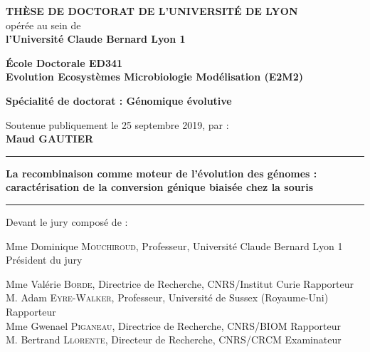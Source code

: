 \begin{center}
\fontsize{14pt}{16pt}\selectfont
\textbf{\uppercase{Thèse de doctorat de l'université de Lyon}}\\
\fontsize{12pt}{14pt}\selectfont
opérée au sein de\\
\textbf{l'Université Claude Bernard Lyon 1}

\vspace{0.5cm}

\textbf{École Doctorale ED341\\%
Evolution Ecosyst\`emes Microbiologie Modélisation (E2M2)}%

\vspace{0.5cm}

\textbf{Spécialité de doctorat : Génomique évolutive}\\


\vspace{1.5cm}

Soutenue publiquement le 25 septembre 2019, par :\\
\vspace{0.1cm}
\fontsize{14pt}{16pt}\selectfont
\textbf{Maud GAUTIER}

\vspace{1.5cm} %

\rule[20pt]{\textwidth}{0.5pt}

\fontsize{25pt}{28pt}\selectfont
\textbf{La recombinaison comme moteur de l'\'evolution des g\'enomes : caract\'erisation de la conversion g\'enique biais\'ee chez la souris}

\rule{\textwidth}{0.5pt}

\vspace{2cm} %
\end{center}

\fontsize{12pt}{14pt}\selectfont
Devant le jury composé de :
\bigskip\bigskip

\fontsize{11pt}{13pt}\selectfont
%
Mme Dominique \textsc{Mouchiroud}, Professeur, Universit\'e Claude Bernard Lyon 1 \hfill Pr\'esident du jury\bigskip %
%

Mme Val\'erie \textsc{Borde}, Directrice de Recherche, CNRS/Institut Curie \hfill  Rapporteur\\
%
M. Adam \textsc{Eyre-Walker}, Professeur, Universit\'e de Sussex (Royaume-Uni) \hfill Rapporteur\\
%
Mme Gwenael \textsc{Piganeau}, Directrice de Recherche, CNRS/BIOM \hfill Rapporteur\\
%
M. Bertrand \textsc{Llorente}, Directeur de Recherche, CNRS/CRCM \hfill Examinateur\bigskip

